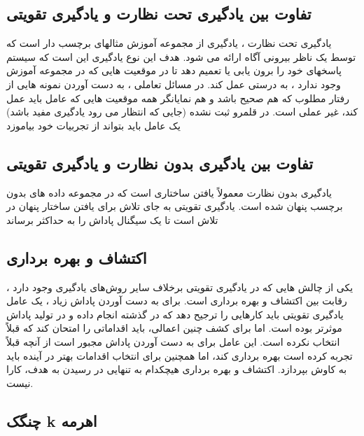 \subsection{تفاوت بین یادگیری تحت نظارت و یادگیری تقویتی}
یادگیری تحت نظارت ، یادگیری از مجموعه آموزش مثالهای برچسب دار است که توسط یک ناظر بیرونی آگاه ارائه می شود. هدف این نوع یادگیری این است که سیستم پاسخهای خود را برون یابی یا تعمیم دهد تا در موقعیت هایی که در مجموعه آموزش وجود ندارد ، به درستی عمل کند. در مسائل تعاملی ، به دست آوردن نمونه هایی از رفتار مطلوب که هم صحیح باشد و هم نمایانگر همه موقعیت هایی که عامل باید عمل کند، غیر عملی است. در قلمرو ثبت نشده (جایی که انتظار می رود یادگیری مفید باشد) یک عامل باید بتواند از تجربیات خود بیاموزد

\subsection{تفاوت بین یادگیری بدون نظارت و یادگیری تقویتی}
یادگیری بدون نظارت معمولاً یافتن ساختاری است که در مجموعه داده های بدون برچسب پنهان شده است. یادگیری تقویتی به جای تلاش برای یافتن ساختار پنهان در تلاش است تا یک سیگنال پاداش را به حداکثر برساند

\subsection{اکتشاف و بهره برداری}
یکی از چالش هایی که در یادگیری تقویتی برخلاف سایر روش‌های یادگیری وجود دارد ، رقابت بین اکتشاف و بهره برداری است. برای به دست آوردن پاداش زیاد ، یک عامل یادگیری تقویتی باید کارهایی را ترجیح دهد که در گذشته انجام داده و در تولید پاداش موثرتر بوده است. اما برای کشف چنین اعمالی، باید اقداماتی را امتحان کند که قبلاً انتخاب نکرده است. این عامل برای به دست آوردن پاداش مجبور است از آنچه قبلاً تجربه کرده است بهره برداری کند، اما همچنین برای انتخاب اقدامات بهتر در آینده باید به کاوش بپردازد. 
اکتشاف و بهره برداری هیچکدام به تنهایی در رسیدن به هدف، کارا نیست.
\subsection{چنگک k اهرمه}

